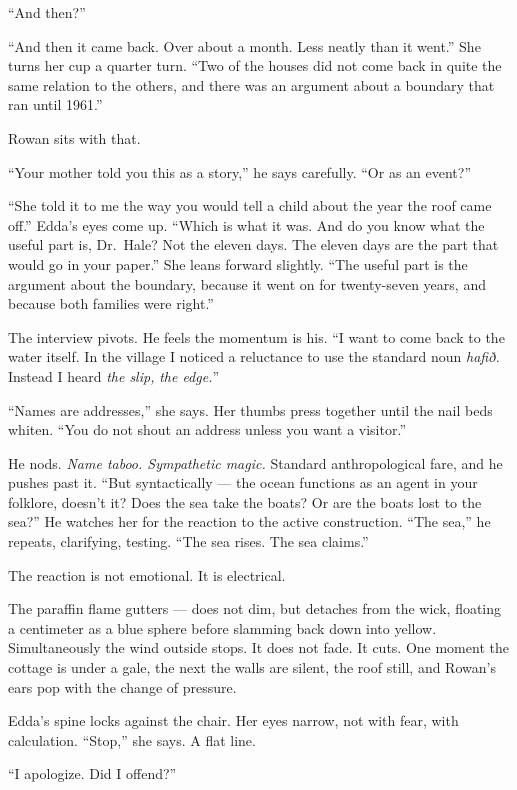 \documentclass[11pt,oneside]{book}
\newcommand{\sceneline}{%
  \par\vspace{1.2em}
  \begin{center}
    \fontsize{11}{11}\selectfont \textbullet\quad\textbullet\quad\textbullet
  \end{center}
  \vspace{0.6em}\noindent\ignorespaces
}
\begin{document}
``And then?''

``And then it came back. Over about a month. Less neatly than it went.''
She turns her cup a quarter turn. ``Two of the houses did not come back
in quite the same relation to the others, and there was an argument
about a boundary that ran until 1961.''

Rowan sits with that.

``Your mother told you this as a story,'' he says carefully. ``Or as an
event?''

``She told it to me the way you would tell a child about the year the
roof came off.'' Edda's eyes come up. ``Which is what it was. And do you
know what the useful part is, Dr.~Hale? Not the eleven days. The eleven
days are the part that would go in your paper.'' She leans forward
slightly. ``The useful part is the argument about the boundary, because
it went on for twenty-seven years, and because both families were
right.''

\sceneline

The interview pivots. He feels the momentum is his. ``I want to come
back to the water itself. In the village I noticed a reluctance to use
the standard noun \emph{hafið.} Instead I heard \emph{the slip,}
\emph{the edge.}''

``Names are addresses,'' she says. Her thumbs press together until the
nail beds whiten. ``You do not shout an address unless you want a
visitor.''

He nods. \emph{Name taboo. Sympathetic magic.} Standard anthropological
fare, and he pushes past it. ``But syntactically --- the ocean functions
as an agent in your folklore, doesn't it? Does the sea take the boats?
Or are the boats lost to the sea?'' He watches her for the reaction to
the active construction. ``The sea,'' he repeats, clarifying, testing.
``The sea rises. The sea claims.''

The reaction is not emotional. It is electrical.

The paraffin flame gutters --- does not dim, but detaches from the wick,
floating a centimeter as a blue sphere before slamming back down into
yellow. Simultaneously the wind outside stops. It does not fade. It
cuts. One moment the cottage is under a gale, the next the walls are
silent, the roof still, and Rowan's ears pop with the change of
pressure.

Edda's spine locks against the chair. Her eyes narrow, not with fear,
with calculation. ``Stop,'' she says. A flat line.

``I apologize. Did I offend?''
\end{document}
